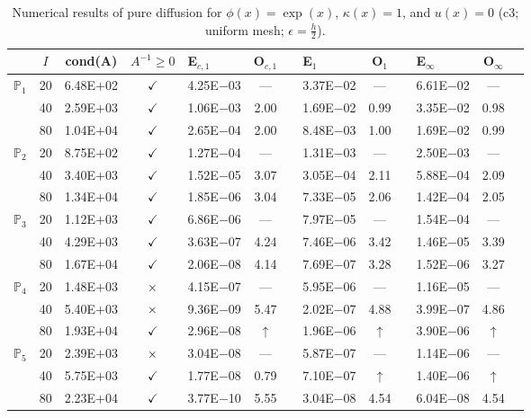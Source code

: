\begin{table}[H]
\centering
\caption{Numerical results of pure diffusion for $\phi(x)=\exp(x)$, $\kappa(x)=1$, and $u(x)=0$ (c3; uniform mesh; $\epsilon=\frac{h}{2}$).}
\begin{tabular}{@{}l c c c l c c l c c l c c@{}}
\toprule
 & $I$ & cond(A) & $A^{-1}\geq 0$ &  E$_{c,1}$ & O$_{c,1}$ && E$_1$ & O$_1$ && E$_{\infty}$ & O$_{\infty}$\\
\midrule
\multirow{3}{*}{$\mathbb{P}_{1}$}
 & 20 & 6.48E$+$02 & $\checkmark$ & 4.25E$-$03 & --- && 3.37E$-$02 & --- && 6.61E$-$02 & ---\\
 & 40 & 2.59E$+$03 & $\checkmark$ & 1.06E$-$03 & 2.00 && 1.69E$-$02 & 0.99 && 3.35E$-$02 & 0.98\\
 & 80 & 1.04E$+$04 & $\checkmark$ & 2.65E$-$04 & 2.00 && 8.48E$-$03 & 1.00 && 1.69E$-$02 & 0.99\\
\midrule
\multirow{3}{*}{$\mathbb{P}_{2}$}
 & 20 & 8.75E$+$02 & $\checkmark$ & 1.27E$-$04 & --- && 1.31E$-$03 & --- && 2.50E$-$03 & ---\\
 & 40 & 3.40E$+$03 & $\checkmark$ & 1.52E$-$05 & 3.07 && 3.05E$-$04 & 2.11 && 5.88E$-$04 & 2.09\\
 & 80 & 1.34E$+$04 & $\checkmark$ & 1.85E$-$06 & 3.04 && 7.33E$-$05 & 2.06 && 1.42E$-$04 & 2.05\\
\midrule
\multirow{3}{*}{$\mathbb{P}_{3}$}
 & 20 & 1.12E$+$03 & $\checkmark$ & 6.86E$-$06 & --- && 7.97E$-$05 & --- && 1.54E$-$04 & ---\\
 & 40 & 4.29E$+$03 & $\checkmark$ & 3.63E$-$07 & 4.24 && 7.46E$-$06 & 3.42 && 1.46E$-$05 & 3.39\\
 & 80 & 1.67E$+$04 & $\checkmark$ & 2.06E$-$08 & 4.14 && 7.69E$-$07 & 3.28 && 1.52E$-$06 & 3.27\\
\midrule
\multirow{3}{*}{$\mathbb{P}_{4}$}
 & 20 & 1.48E$+$03 & $\times$ & 4.15E$-$07 & --- && 5.95E$-$06 & --- && 1.16E$-$05 & ---\\
 & 40 & 5.40E$+$03 & $\times$ & 9.36E$-$09 & 5.47 && 2.02E$-$07 & 4.88 && 3.99E$-$07 & 4.86\\
 & 80 & 1.93E$+$04 & $\checkmark$ & 2.96E$-$08 & $\uparrow$ && 1.96E$-$06 & $\uparrow$ && 3.90E$-$06 & $\uparrow$\\
\midrule
\multirow{3}{*}{$\mathbb{P}_{5}$}
 & 20 & 2.39E$+$03 & $\times$ & 3.04E$-$08 & --- && 5.87E$-$07 & --- && 1.14E$-$06 & ---\\
 & 40 & 5.75E$+$03 & $\checkmark$ & 1.77E$-$08 & 0.79 && 7.10E$-$07 & $\uparrow$ && 1.40E$-$06 & $\uparrow$\\
 & 80 & 2.23E$+$04 & $\checkmark$ & 3.77E$-$10 & 5.55 && 3.04E$-$08 & 4.54 && 6.04E$-$08 & 4.54\\
\bottomrule
\end{tabular}
\end{table}